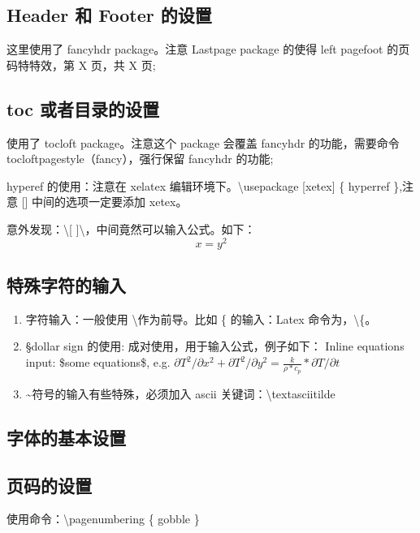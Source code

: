 \documentclass[UTF8,fancyhdr,a4paper]{ctexart}
\begin{document}
\subsection{Header 和 Footer 的设置}
这里使用了 fancyhdr package。注意 Lastpage package 的使得 left pagefoot 的页码特特效，第 X 页，共 X 页;
\subsection{toc 或者目录的设置}
使用了 tocloft package。注意这个 package 会覆盖 fancyhdr 的功能，需要命令 tocloftpagestyle（fancy），强行保留 fancyhdr 的功能;\par
hyperef 的使用：注意在 xelatex 编辑环境下。\textbackslash usepackage [xetex] \{ hyperref \},注意 [\space] 中间的选项一定要添加 xetex。\par 
意外发现：\textbackslash[ \space ]\textbackslash ，中间竟然可以输入公式。如下：
\[ x = y^2 \]


\subsection{特殊字符的输入}

\begin{enumerate}
\item
字符输入：一般使用 \textbackslash \space 作为前导。比如 \{ 的输入：Latex 命令为，\textbackslash \{。

\item 
\S \space dollar sign 的使用: 成对使用，用于输入公式，例子如下：
Inline equations input: \$some equations\$, e.g. $\partial T^2/\partial x^2 + \partial T^2/\partial y^2 =\frac{k}{\rho*c_p}*{\partial T/\partial t} $

\item
\textasciitilde 符号的输入有些特殊，必须加入 ascii 关键词：\textbackslash textasciitilde

\end{enumerate}

\subsection{字体的基本设置}



\subsection{页码的设置}
使用命令：\textbackslash pagenumbering \{ gobble \}
\end{document}

